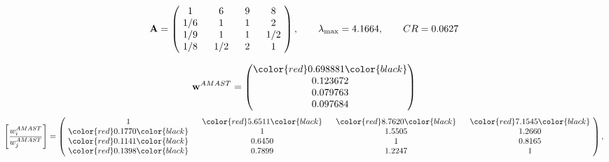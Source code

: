 \begin{example}
\begin{equation*}
\mathbf{A} =
\begin{pmatrix}
$\,\,$ 1 $\,\,$ & $\,\,$6$\,\,$ & $\,\,$9$\,\,$ & $\,\,$8 $\,\,$ \\
$\,\,$ 1/6$\,\,$ & $\,\,$ 1 $\,\,$ & $\,\,$1$\,\,$ & $\,\,$2 $\,\,$ \\
$\,\,$ 1/9$\,\,$ & $\,\,$ 1 $\,\,$ & $\,\,$ 1 $\,\,$ & $\,\,$ 1/2 $\,\,$ \\
$\,\,$ 1/8$\,\,$ & $\,\,$ 1/2$\,\,$ & $\,\,$2$\,\,$ & $\,\,$ 1  $\,\,$ \\
\end{pmatrix},
\qquad
\lambda_{\max} =
4.1664,
\qquad
CR = 0.0627
\end{equation*}

\begin{equation*}
\mathbf{w}^{AMAST} =
\begin{pmatrix}
\color{red} 0.698881\color{black} \\
0.123672\\
0.079763\\
0.097684
\end{pmatrix}\end{equation*}
\begin{equation*}
\left[ \frac{{w}^{AMAST}_i}{{w}^{AMAST}_j} \right] =
\begin{pmatrix}
$\,\,$ 1 $\,\,$ & $\,\,$\color{red} 5.6511\color{black} $\,\,$ & $\,\,$\color{red} 8.7620\color{black} $\,\,$ & $\,\,$\color{red} 7.1545\color{black} $\,\,$ \\
$\,\,$\color{red} 0.1770\color{black} $\,\,$ & $\,\,$ 1 $\,\,$ & $\,\,$1.5505$\,\,$ & $\,\,$1.2660  $\,\,$ \\
$\,\,$\color{red} 0.1141\color{black} $\,\,$ & $\,\,$0.6450$\,\,$ & $\,\,$ 1 $\,\,$ & $\,\,$0.8165 $\,\,$ \\
$\,\,$\color{red} 0.1398\color{black} $\,\,$ & $\,\,$0.7899$\,\,$ & $\,\,$1.2247$\,\,$ & $\,\,$ 1  $\,\,$ \\
\end{pmatrix},
\end{equation*}


\end{example}
